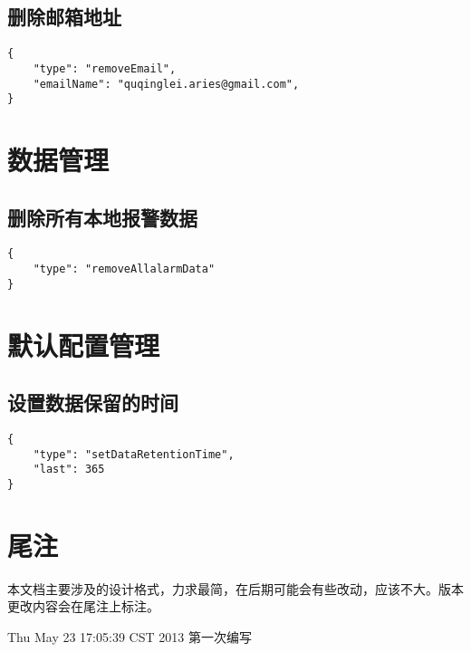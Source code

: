 \documentclass{article}
\begin{document}
\subsection{删除邮箱地址}
\begin{verbatim}
{
    "type": "removeEmail",
    "emailName": "quqinglei.aries@gmail.com",
}
\end{verbatim}

\section{数据管理}
\subsection{删除所有本地报警数据}
\begin{verbatim}
{
    "type": "removeAllalarmData"
}
\end{verbatim}

\section{默认配置管理}
\subsection{设置数据保留的时间}
\begin{verbatim}
{
    "type": "setDataRetentionTime",
    "last": 365
}
\end{verbatim}

\section{尾注}
本文档主要涉及的设计格式，力求最简，在后期可能会有些改动，应该不大。版本
更改内容会在尾注上标注。

Thu May 23 17:05:39 CST 2013 第一次编写
\end{document}
